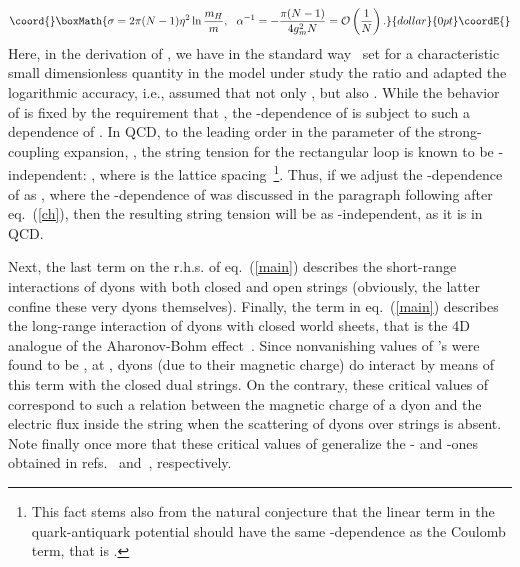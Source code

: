 \documentclass[a4paper,12pt]{article}
\begin{document}
$$\coord{}\boxMath{
\sigma=2\pi(N-1)\eta^2\ln\frac{m_H}{m},~~\alpha^{-1}=-\frac{\pi(N-1)}{4g_m^2N}={\cal O}\left(\frac{1}{N}\right).}{dollar}{0pt}\coordE{}$$
Here, in the derivation of \myHighlight{$\sigma$}\coordHE{}, we have in the standard way~\cite{ano} set for a characteristic small
dimensionless quantity in the model under study the ratio \coordHE{} and adapted the logarithmic accuracy, i.e.,
assumed that not only \coordHE{}, but also \coordHE{}. While the \coordHE{} behavior
of \coordHE{} is fixed by the requirement that \coordHE{},
the \coordHE{}-dependence of \myHighlight{$\sigma$}\coordHE{} is subject to such a dependence of \myHighlight{$\eta$}\coordHE{}. In QCD, to the leading order in the
parameter of the strong-coupling expansion, \coordHE{}, the string tension for the rectangular
loop is known to be \coordHE{}-independent: \coordHE{},
where \coordHE{} is the lattice spacing~\footnote{This fact stems also from the natural conjecture that the linear term in the
quark-antiquark potential should have the same \coordHE{}-dependence as the Coulomb term, that is
\coordHE{}.}. Thus, if we adjust the \coordHE{}-dependence of \myHighlight{$\eta$}\coordHE{}
as \coordHE{}, where the \coordHE{}-dependence of \myHighlight{$\lambda$}\coordHE{} was discussed
in the paragraph following after eq.~(\ref{ch}), then the resulting string tension will be as \coordHE{}-independent,
as it is in QCD.


Next, the last term on the r.h.s. of eq.~(\ref{main}) describes
the short-range interactions
of dyons with both closed and open strings (obviously, the latter confine these very dyons themselves).
Finally, the term \coordHE{} in eq.~(\ref{main})
describes the long-range
interaction of dyons with closed world sheets, that is the 4D analogue of the Aharonov-Bohm effect~\cite{four}.
Since nonvanishing values of \coordHE{}'s were found to be \coordHE{},
at \coordHE{},
dyons (due to their magnetic charge) do interact by means of this term with the closed dual strings.
On the contrary, these critical values of \myHighlight{$\Theta$}\coordHE{}
correspond to such a relation
between the magnetic charge of a dyon and the electric flux inside the
string when the scattering of dyons over strings is absent.
Note finally once more that these critical values of \myHighlight{$\Theta$}\coordHE{} generalize the \coordHE{}- and \coordHE{}-ones
obtained in refs.~\cite{emil} and~\cite{theta}, respectively.
\end{document}
